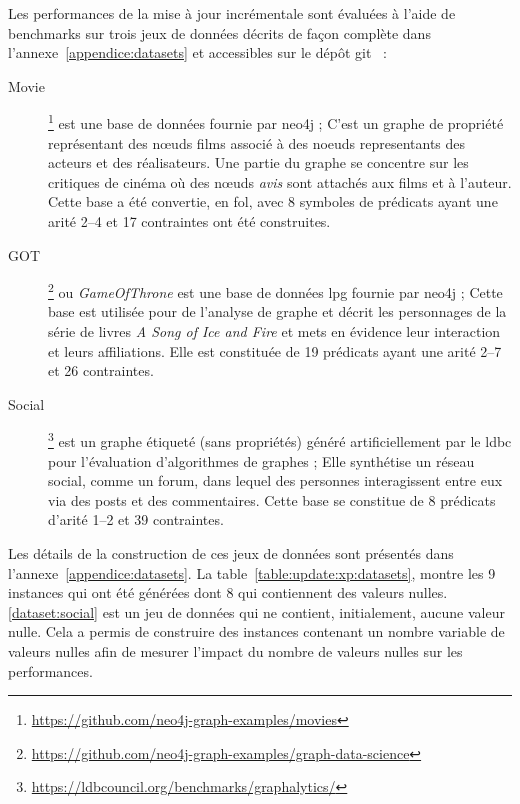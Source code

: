 Les performances de la mise à jour incrémentale sont évaluées à l'aide de benchmarks sur trois jeux de données décrits de façon complète dans l'annexe~\ref{appendice:datasets} et accessibles sur le dépôt \gls{git}~\cite{hiotUpdateChase2023} :
\begin{description}
    \item[Movie]\label{dataset:movies}\footnote{\url{https://github.com/neo4j-graph-examples/movies}} est une base de données fournie par \gls{neo4j} ;
          C'est un graphe de propriété représentant des nœuds films associé à des noeuds representants des acteurs et des réalisateurs.
          Une partie du graphe se concentre sur les critiques de cinéma où des nœuds \textit{avis} sont attachés aux films et à l'auteur.
          Cette base a été convertie, en \gls{fol}, avec \num{8} symboles de prédicats ayant une arité \numrange{2}{4} et \num{17} contraintes ont été construites.
    \item[GOT]\label{dataset:got}\footnote{\url{https://github.com/neo4j-graph-examples/graph-data-science}} ou \textit{GameOfThrone} est une base de données \gls{lpg} fournie par \gls{neo4j} ;
          Cette base est utilisée pour de l'analyse de graphe et décrit les personnages de la série de livres \textit{A Song of Ice and Fire} et mets en évidence leur interaction et leurs affiliations.
          Elle est constituée de \num{19} prédicats ayant une arité \numrange{2}{7} et \num{26} contraintes.
    \item[Social]\label{dataset:social}\footnote{\url{https://ldbcouncil.org/benchmarks/graphalytics/}} est un graphe étiqueté (sans propriétés) généré artificiellement par le \gls{ldbc} pour l'évaluation d'algorithmes de graphes ;
          Elle synthétise un réseau social, comme un forum, dans lequel des personnes interagissent entre eux via des posts et des commentaires.
          Cette base se constitue de \num{8} prédicats d'arité \numrange{1}{2} et \num{39} contraintes.
\end{description}

Les détails de la construction de ces jeux de données sont présentés dans l'annexe~\ref{appendice:datasets}.
La table~\ref{table:update:xp:datasets}, montre les 9 instances qui ont été générées dont 8 qui contiennent des valeurs nulles.
\ref{dataset:social} est un jeu de données qui ne contient, initialement, aucune valeur nulle.
Cela a permis de construire des instances contenant un nombre variable de valeurs nulles afin de mesurer l'impact du nombre de valeurs nulles sur les performances.

